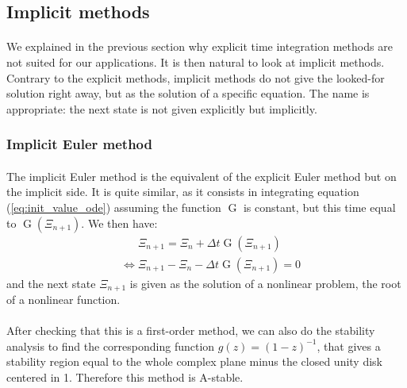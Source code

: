     \subsection{Implicit methods}

      \paragraph{}
      We explained in the previous section why explicit time integration methods are not suited for our applications.
      It is then natural to look at implicit methods.
      Contrary to the explicit methods, implicit methods do not give the looked-for solution right away, but as the solution of a specific equation.
      The name is appropriate: the next state is not given explicitly but implicitly.


      \subsubsection{Implicit Euler method}

        \paragraph{}
        The implicit Euler method is the equivalent of the explicit Euler method but on the implicit side.
        It is quite similar, as it consists in integrating equation (\ref{eq:init_value_ode}) assuming the function $\operatorname{G}$ is constant, but this time equal to $\operatorname{G}\left(\Xi_{n+1}\right)$.
        We then have:
        \begin{equation}
          \begin{aligned}
            & \phantom{{} \Leftrightarrow {}} \Xi_{n+1} = \Xi_n + \Delta t \operatorname{G}\left(\Xi_{n+1}\right) \\
            &             \Leftrightarrow     \Xi_{n+1} - \Xi_n - \Delta t \operatorname{G}\left(\Xi_{n+1}\right) = 0
          \end{aligned}
        \end{equation}
        and the next state $\Xi_{n+1}$ is given as the solution of a nonlinear problem, the root of a nonlinear function.

        \paragraph{}
        After checking that this is a first-order method, we can also do the stability analysis to find the corresponding function $g\left(z\right) = \left(1 - z\right)^{-1}$, that gives a stability region equal to the whole complex plane minus the closed unity disk centered in 1.
        Therefore this method is A-stable.


